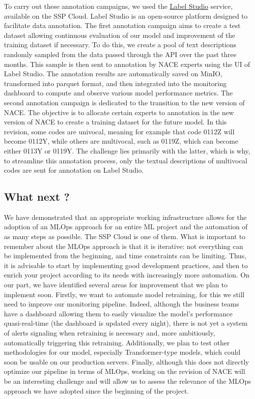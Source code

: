 To carry out these annotation campaigns, we used the \href{https://labelstud.io/}{Label Studio} service, available on the SSP Cloud. Label Studio is an open-source platform designed to facilitate data annotation. The first annotation campaign aims to create a test dataset allowing continuous evaluation of our model and improvement of the training dataset if necessary. To do this, we create a pool of text descriptions randomly sampled from the data passed through the API over the past three months. This sample is then sent to annotation by NACE experts using the UI of Label Studio. The annotation results are automatically saved on MinIO, transformed into parquet format, and then integrated into the monitoring dashboard to compute and observe various model performance metrics. The second annotation campaign is dedicated to the transition to the new version of NACE. The objective is to allocate certain experts to annotation in the new version of NACE to create a training dataset for the future model. In this revision, some codes are univocal, meaning for example that code 0112Z will become 0112Y, while others are multivocal, such as 0119Z, which can become either 0113Y or 0119Y. The challenge lies primarily with the latter, which is why, to streamline this annotation process, only the textual descriptions of multivocal codes are sent for annotation on Label Studio.


\subsection{What next ?}

We have demonstrated that an appropriate working infrastructure allows for the adoption of an MLOps approach for an entire ML project and the automation of as many steps as possible. The SSP Cloud is one of them. What is important to remember about the MLOps approach is that it is iterative: not everything can be implemented from the beginning, and time constraints can be limiting. Thus, it is advisable to start by implementing good development practices, and then to enrich your project according to its needs with increasingly more automation. On our part, we have identified several areas for improvement that we plan to implement soon. Firstly, we want to automate model retraining, for this we still need to improve our monitoring pipeline. Indeed, although the business teams have a dashboard allowing them to easily visualize the model's performance quasi-real-time (the dashboard is updated every night), there is not yet a system of alerts signaling when retraining is necessary and, more ambitiously, automatically triggering this retraining. Additionally, we plan to test other methodologies for our model, especially Transformer-type models, which could soon be usable on our production servers. Finally, although this does not directly optimize our pipeline in terms of MLOps, working on the revision of NACE will be an interesting challenge and will allow us to assess the relevance of the MLOps approach we have adopted since the beginning of the project.
